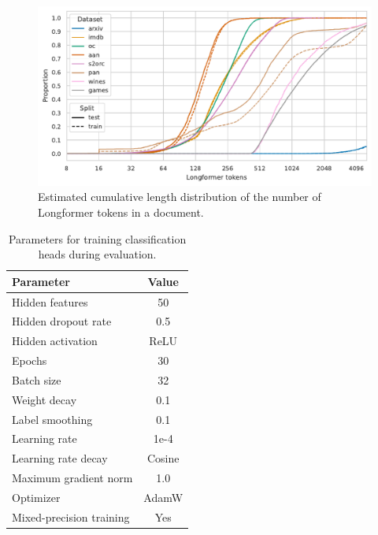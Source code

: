 \begin{figure}
    \includegraphics[width=\textwidth]{./img/eval_tasks_token_ecdf.pdf}

    \caption{Estimated cumulative length distribution of the number of
    Longformer tokens in a document.}

    \label{fig:eval_task_longformer_token_dist}
\end{figure}


\begin{table}
  \centering
  \begin{tabular}{l c}
    \toprule
    Parameter & Value \\
    \midrule
    Hidden features & 50 \\
    Hidden dropout rate & 0.5 \\
    Hidden activation & ReLU \\
    Epochs & 30 \\
    Batch size & 32 \\
    Weight decay & 0.1 \\
    Label smoothing & 0.1 \\
    Learning rate & 1e-4 \\
    Learning rate decay & Cosine \\
    Maximum gradient norm & 1.0 \\
    Optimizer & AdamW \\
    Mixed-precision training & Yes \\
    \bottomrule
  \end{tabular}

  \caption{Parameters for training classification heads during evaluation.}
  \label{table:head_train_eval_params}
\end{table}


